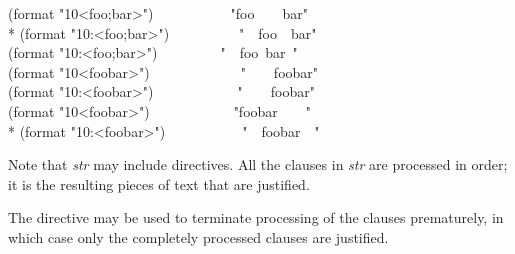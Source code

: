 \begin{flushdesc}
\begin{lisp}
(format {\false} "{\Xtilde}10<foo{\Xtilde};bar{\Xtilde}>")~~~~~~~~~~\EV\  "foo~~~~bar" \\*
(format {\false} "{\Xtilde}10:<foo{\Xtilde};bar{\Xtilde}>")~~~~~~~~~\EV\  "~~foo~~bar" \\
(format {\false} "{\Xtilde}10:{\Xatsign}<foo{\Xtilde};bar{\Xtilde}>")~~~~~~~~\EV\  "~~foo~bar~" \\
(format {\false} "{\Xtilde}10<foobar{\Xtilde}>")~~~~~~~~~~~~\EV\  "~~~~foobar" \\
(format {\false} "{\Xtilde}10:<foobar{\Xtilde}>")~~~~~~~~~~~\EV\  "~~~~foobar" \\
(format {\false} "{\Xtilde}10{\Xatsign}<foobar{\Xtilde}>")~~~~~~~~~~~\EV\  "foobar~~~~" \\*
(format {\false} "{\Xtilde}10:{\Xatsign}<foobar{\Xtilde}>")~~~~~~~~~~\EV\  "~~foobar~~"
\end{lisp}

Note that \emph{str} may include  directives.
All the clauses in \emph{str} are processed in order;
it is the resulting pieces of text that are justified.

The \cd{{\Xtilde}{\Xcircumflex}} directive may be used to terminate processing
of the clauses prematurely, in which case only the completely processed clauses
are justified.


\end{flushdesc}
